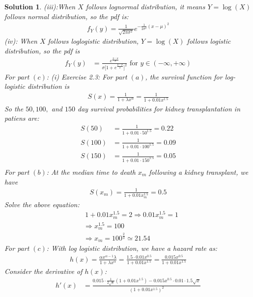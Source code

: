 \documentclass[11pt]{article}
\newtheorem{sol}{Solution}
\begin{document}
\begin{sol}
	(iii):When $X$ follows lognormal distribution, it means $Y = \log(X)$ follows normal distribution, so the pdf is:
	\begin{align*}
		f_Y(y)= \frac{1}{\sqrt{2\pi\sigma^2}}e^{-\frac{1}{2\sigma^2}(x - \mu)^2}
	\end{align*}
	(iv): When $X$ follows loglogistic distribution, $Y = \log(X)$ follows logistic distribution, so the pdf is
	\begin{align*}
		f_Y(y) &= \frac{e^{\frac{y- \mu}{\sigma}}}{\sigma\Big[1 + e^{\frac{y - \mu}{\sigma}}\Big]^2} \text{ for } y \in (-\infty, +\infty)
	\end{align*}
	For part $(c)$:\vskip 2mm
	(i) Exercise 2.3:\vskip 2mm
	\hskip 2cm For part $(a)$, the survival function for log-logistic distribution is 
	\begin{align*}
		S(x) = \frac{1}{1 + \lambda x^{\alpha}} = \frac{1}{1 + 0.01 x^{1.5}}
	\end{align*}
	So the $50, 100,$ and $150$ day survival probabilities for kidney transplantation in patiens are:
	\begin{align*}
		S(50) &= \frac{1}{1 + 0.01 \cdot 50^{1.5}} =0.22 \\
		S(100) &=\frac{1}{1 + 0.01 \cdot 100^{1.5}} =0.09 \\
		S(150) &= \frac{1}{1 + 0.01 \cdot 150^{1.5}} = 0.05\\
	\end{align*}
	\hskip 2cm For part $(b)$:\vskip 2mm
	At the median time to death $x_m$ following a kidney transplant, we have
	\begin{align*}
		S(x_m) =  \frac{1}{1 + 0.01 x_m^{1.5}} = 0.5
	\end{align*}
	Solve the above equation:
	\begin{align*}
		&\ 1 + 0.01 x_m^{1.5} = 2 \Longrightarrow 0.01 x_m^{1.5} = 1\\
		&\Longrightarrow x_m^{1.5} = 100\\
		&\Longrightarrow x_m = 100^{\frac{2}{3}} \simeq 21.54
	\end{align*}
	\hskip 2cm For part $(c)$:\vskip 2mm
	With log logistic distribution, we have a hazard rate as:
	\begin{align*}
		h(x) = \frac{\alpha x^{\alpha - 1}\lambda}{1 + \lambda x^{\alpha}} = \frac{1.5\cdot 0.01x^{0.5}}{1 + 0.01 x^{1.5}} = \frac{0.015 x^{0.5}}{1 + 0.01x^{1.5}}
	\end{align*}
	Consider the derivative of $h(x)$:
	\begin{align*}
		h'(x) &= \frac{0.015\cdot \frac{1}{2\sqrt{x}}(1 + 0.01 x^{1.5}) - 0.015 x^{0.5}\cdot 0.01\cdot 1.5\sqrt{x}}{(1 + 0.01 x^{1.5})^2}\\

\end{align*}
\end{sol}
\end{document}
